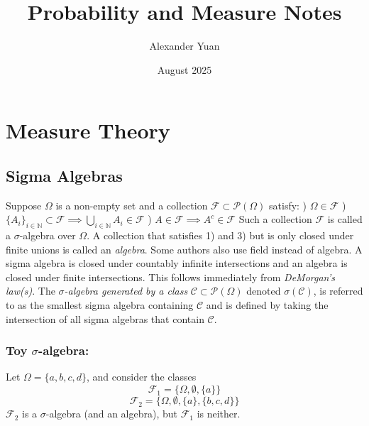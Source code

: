 \documentclass{article}
\title{Probability and Measure Notes}
\author{Alexander Yuan}
\date{August 2025}
\begin{document}
\maketitle
\section{Measure Theory}

\subsection{Sigma Algebras}
Suppose $\Omega$ is a non-empty set and a collection $\mathcal{F} \subset \mathcal{P}(\Omega)$ satisfy: \newline {}) $\Omega \in \mathcal{F}$ \newline {}) $\{A_i\}_{i \in \mathbb{N}} \subset \mathcal{F} \implies \bigcup_{i \in\mathbb{N}}A_i \in \mathcal{F}$ \newline {}) $A \in \mathcal{F} \implies A^c\in \mathcal{F} $ \newline \newline
Such a collection  $\mathcal{F}$ is called a $\sigma$-algebra over $\Omega$. A collection that satisfies 1) and 3) but is only closed under finite unions is called an \emph{algebra}. Some authors also use field instead of algebra. \newline \newline
A sigma algebra is closed under countably infinite intersections and an algebra is closed under finite intersections. This follows immediately from \emph{DeMorgan's law(s)}.\newline \newline
The \emph{$\sigma$-algebra generated by a class} $\mathcal{C}\subset \mathcal{P}(\Omega)$ denoted $\sigma(\mathcal{C})$, is referred to as the smallest sigma algebra containing $\mathcal{C}$ and is defined by taking the intersection of all sigma algebras that contain $\mathcal{C}$.

\subsubsection{Toy $\sigma$-algebra:}
Let $\Omega = \{a,b,c,d\}$, and consider the classes \[
\mathcal{F}_1 = \{\Omega, \emptyset, \{a\}\}
\]
\[
\mathcal{F}_2 = \{\Omega, \emptyset, \{a\}, \{b,c,d\}\}
\]
$\mathcal{F}_2$ is a $\sigma$-algebra (and an algebra), but $\mathcal{F}_1$ is neither. 
\end{document}

